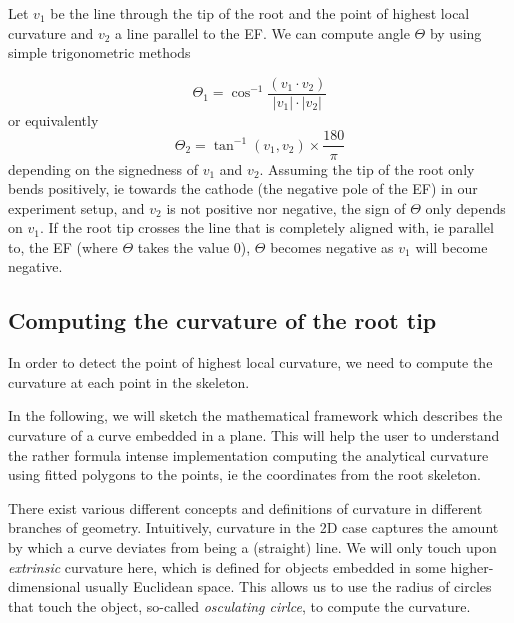 

Let \( v_{1} \) be the line through the tip of the root and the point of highest local curvature and \( v_{2} \) a line parallel to the EF. 
We can compute angle \( \Theta \)  by using simple trigonometric methods 

\begin{equation} \label{angle1}
\Theta_{1}  = \cos^{-1}\frac{( v_{1} \cdot v_{2}) }{ | v_{1} | \cdot | v_{2} |}
\end{equation}
or equivalently
\begin{equation} \label{angle2}
\Theta_{2} = \tan^{-1}( v_{1}, v_{2}) \times \frac{180}{\pi}
\end{equation}
depending on the signedness of \( v_{1} \) and \( v_{2} \). Assuming the tip of the root only bends positively, ie towards the cathode (the negative pole of the EF) in our experiment setup, and \( v_{2} \) is not positive nor negative, the sign of \( \Theta \) only depends on \( v_{1} \). If the root tip crosses the line that is completely aligned with, ie parallel to, the EF (where \( \Theta \) takes the value 0), \( \Theta \) becomes negative as \( v_{1} \) will become negative. 


\subsection{Computing the curvature of the root tip}


In order to detect the point of highest local curvature, we need to compute the curvature at each point in the skeleton. 


In the following, we will sketch the mathematical framework which describes the curvature of a curve embedded in a plane.
This will help the user to understand the rather formula intense implementation computing the analytical curvature using fitted polygons to the points, ie the coordinates from the root skeleton.

There exist various different concepts and definitions of curvature in different branches of geometry.
Intuitively, curvature in the 2D case captures the amount by which a curve deviates from being a (straight) line.
We will only touch upon \textit{extrinsic} curvature here, which is defined for objects embedded in some higher-dimensional usually Euclidean space. This allows us to use the radius of circles that touch the object, so-called \textit{osculating cirlce}, to compute the curvature.

